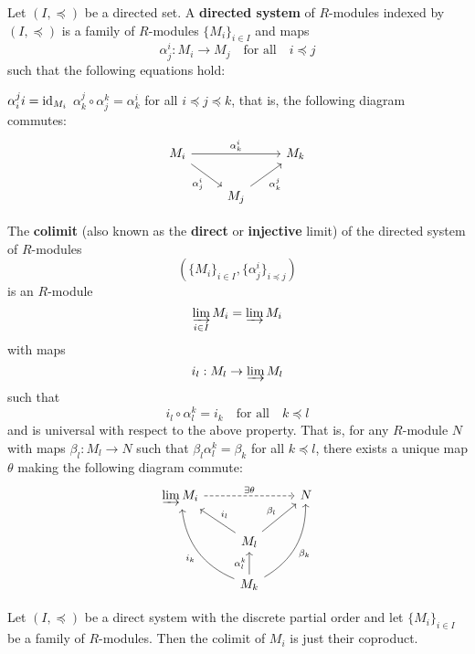 \begin{defn}[1.13]
	\begin{enum}
		\io Let $(I,\preceq)$ be a directed set.
		A \textbf{directed system} of $R$-modules indexed by $(I,\preceq)$ is a family of $R$-modules $\{M_i\}_{i \in I}$ and maps
		\[\alpha_j^i: M_i \to M_j \quad \text{for all} \quad i \preceq j\]
		such that the following equations hold:
		\begin{enum}
			\io $\alpha_i^ji= \operatorname{id}_{M_i}$
			\io $\alpha_k^j \circ \alpha_j^k = \alpha_k^i$ for all $i \preceq j \preceq k$, that is, the following diagram commutes:
			\[
			\begin{tikzcd}
				M_i \arrow[rd, "\alpha_j^i"'] \arrow[rr, "\alpha_k^i"] &  & M_k \\
				& M_j \arrow[ru, "\alpha_k^j"'] & 
			\end{tikzcd}
			\]
		\end{enum}
		\io The \textbf{colimit} (also known as the \textbf{direct} or \textbf{injective} limit)
		of the directed system of $R$-modules
		\[\left(\{M_i\}_{i \in I}, \{\alpha_j^i\}_{i \preceq j}\right)\]
		is an $R$-module
		\[\varinjlim_{i \in I} M_i = \varinjlim M_i\]
		with maps
		\[i_l: M_l \to \varinjlim M_l\]
		such that
		\[i_l \circ \alpha_l^k = i_k \quad \text{for all} \quad k \preceq l\]
		and is universal with respect to the above property.
		That is, for any $R$-module $N$ with maps $\beta_l: M_l \to N$ such that $\beta_l\alpha_l^k=\beta_k$ for all $k \preceq l$, there exists a unique map $\theta$ making the following diagram commute:
		\[
		\begin{tikzcd}
			\varinjlim M_i \arrow[rr, "\exists \theta", dashed] &  & N \\
			& M_l \arrow[lu, "i_l"'] \arrow[ru, "\beta_l"] &  \\
			& M_k \arrow[luu, "i_k", bend left] \arrow[ruu, "\beta_k"', bend right] \arrow[u, "\alpha_l^k"] & 
		\end{tikzcd}
		\]
	\end{enum}
\end{defn}

\begin{exam}
	Let $(I,\preceq)$ be a direct system with the discrete partial order and let $\{M_i\}_{i \in I}$ be a family of $R$-modules.
	Then the colimit of $M_i$ is just their coproduct.
\end{exam}